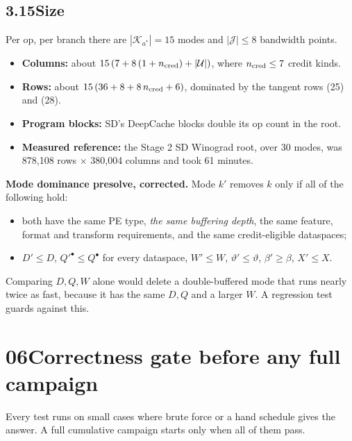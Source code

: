 \documentclass[10pt]{article}
\renewcommand{\_}{\textunderscore\allowbreak}
\begin{document}
\subsection*{3.15\quad Size}
 

Per op, per branch there are $|\mathcal K_{a^\ast}|=15$ modes and $|\mathcal J|\le8$ bandwidth points.

 
\begin{itemize}
 \item \textbf{Columns:} about $15\,\allowbreak{}(7+8\,\allowbreak{}(1+n_{\rm cred})+|\mathcal U|)$, where $n_{\rm cred}\le7$ credit kinds.
 \item \textbf{Rows:} about $15\,\allowbreak{}(36+8+8\,\allowbreak{}n_{\rm cred}+6)$, dominated by the tangent rows (25) and (28).
 \item \textbf{Program blocks:} SD's DeepCache blocks double its op count in the root.
 \item \textbf{Measured reference:} the Stage 2 SD Winograd root, over 30 modes, was 878,108 rows $\times$ 380,004 columns and took 61 minutes.
 
\end{itemize}
 

\textbf{Mode dominance presolve, corrected.} Mode $k'$ removes $k$ only if all of the following hold:

 
\begin{itemize}
 \item both have the same PE type, \emph{the same buffering depth}, the same feature, format and transform requirements, and the same credit-eligible dataspaces;
 \item $D'\le D$, $Q'^{\bullet}\le Q^{\bullet}$ for every dataspace, $W'\le W$, $\vartheta'\le\vartheta$, $\beta'\ge\beta$, $X'\le X$.
 
\end{itemize}
 

Comparing $D,\allowbreak{}Q,\allowbreak{}W$ alone would delete a double-buffered mode that runs nearly twice as fast, because it has the same $D,\allowbreak{}Q$ and a larger $W$. A regression test guards against this.

   
\section*{06\quad Correctness gate before any full campaign}
 

Every test runs on small cases where brute force or a hand schedule gives the answer. A full cumulative campaign starts only when all of them pass.
\end{document}

